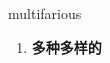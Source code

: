 
\begin{frame}
{\huge multifarious}
\begin{center}
\begin{enumerate}\Large
  \item \textbf{多种多样的}
\end{enumerate}
\end{center}
\end{frame}
